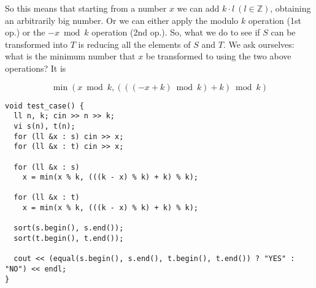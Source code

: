 So this means that starting from a number $x$ we can add $k \cdot l\ (l\in \mathbb{Z})$, obtaining an arbitrarily big number. Or we can either apply the modulo $k$ operation (1st op.) or the $-x \bmod k$ operation (2nd op.). So, what we do to see if $S$ can be transformed into $T$ is reducing all the elements of $S$ and $T$. We ask ourselves: what is the minimum number that $x$ be transformed to using the two above operations? It is

\begin{equation}
    \min(x \bmod k, (((-x + k) \bmod k) + k) \bmod k)
\end{equation}

\begin{verbatim}
void test_case() {
  ll n, k; cin >> n >> k;
  vi s(n), t(n);
  for (ll &x : s) cin >> x;
  for (ll &x : t) cin >> x;
 
  for (ll &x : s)
    x = min(x % k, (((k - x) % k) + k) % k);

  for (ll &x : t)
    x = min(x % k, (((k - x) % k) + k) % k);

  sort(s.begin(), s.end());
  sort(t.begin(), t.end());
  
  cout << (equal(s.begin(), s.end(), t.begin(), t.end()) ? "YES" : "NO") << endl;
}
\end{verbatim}

